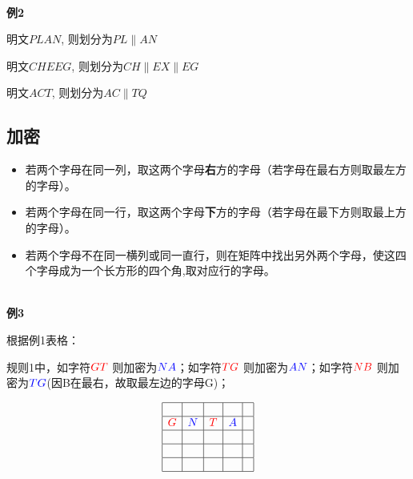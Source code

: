 \documentclass{article}
\begin{document}
~\\

\textbf{例2}

明文$PLAN$, 则划分为$PL \| AN$ 

明文$CHEEG$, 则划分为$CH \| EX \| EG$ 

明文$ACT$, 则划分为$AC \| TQ$  \qquad\qquad\qquad\qquad\qquad\qquad\qquad\qquad\qquad\qquad\qquad\qquad \Box

\subsection{加密}
\begin{itemize}
\item 若两个字母在同一列，取这两个字母\textbf{右}方的字母（若字母在最右方则取最左方的字母）。
\item 若两个字母在同一行，取这两个字母\textbf{下}方的字母（若字母在最下方则取最上方的字母）。
\item 若两个字母不在同一横列或同一直行，则在矩阵中找出另外两个字母，使这四个字母成为一个长方形的四个角,取对应行的字母。
\end{itemize}

~\\

\textbf{例3}

根据例1表格：


规则1中，如字符${\color{red}GT}$ 则加密为${\color{blue}NA}$；如字符${\color{red}TG}$ 则加密为${\color{blue}AN}$；如字符${\color{red}NB}$ 则加密为${\color{blue}TG}$(因B在最右，故取最左边的字母G)；

$$
\begin{array}{|c|c|c|c|c|}
\hline &  & &   &   \\
\hline {\color{red}G} &  {\color{blue}N} &  {\color{red}T} & {\color{blue}A} &  \\
\hline &  & &   &   \\
\hline &  & &   &   \\
\hline &  & &   &   \\
\hline
\end{array}
$$
\end{document}

